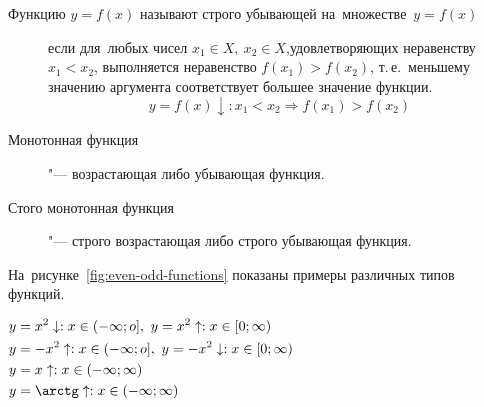 \documentclass[]{scrartcl}
\begin{document}
\begin{description}
	\item[Функцию ${\textstyle y=f(x)}$ называют строго убывающей на~множестве~${\textstyle y=f(x)}$] если для~любых чисел ${\textstyle x_1 \in X,\ x_2 \in X}$,удовлетворяющих неравенству ${\textstyle x_1 < x_2}$, выполняется неравенство ${\textstyle f(x_1) > f(x_2)}$, т.\,е.~меньшему значению аргумента соответствует большее значение функции.
	\begin{equation}\label{eq:function-9}
	y=f(x)\downarrow :x_1 < x_2 \Rightarrow f(x_1) > f(x_2)
	\end{equation}
\end{description}
\begin{description}
	\item[Монотонная функция]"--- возрастающая либо убывающая функция.
\end{description}
\begin{description}
	\item[Стого монотонная функция]"--- строго возрастающая либо строго убывающая функция.
\end{description}
На~рисунке~\ref{fig:even-odd-functions} показаны примеры различных типов функций.
\begin{Thexmpl}
	$\begin{aligned}
	y&=x^2\downarrow:x\in (-\infty;o],\ y=x^2\uparrow:x\in [0;\infty)\\
	y&=-x^2\uparrow:x\in (-\infty;o],\ y=-x^2\downarrow:x\in [0;\infty)\\
	y&=x\uparrow:x\in (-\infty;\infty)\\
	y&=\arctg \uparrow:x\in (-\infty;\infty)\\
	\end{aligned}$
\end{Thexmpl}
\end{document}
